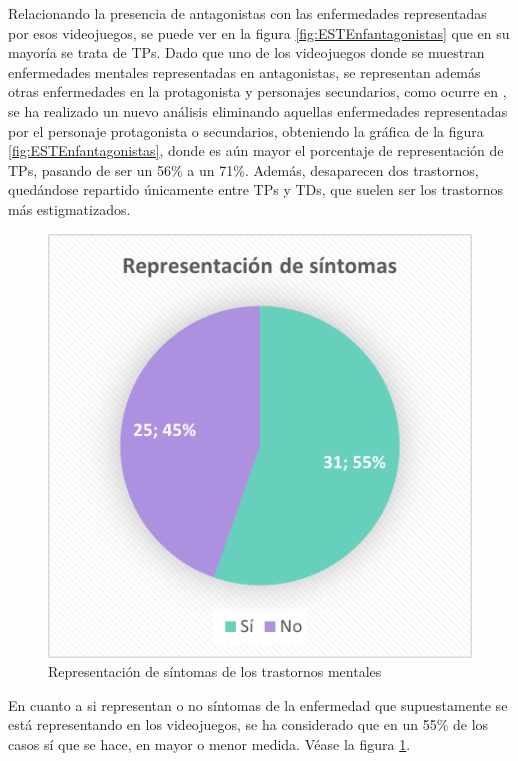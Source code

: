 \documentclass[12pt, a4paper,twoside,titlepage]{book}
\begin{document}
 
Relacionando la presencia de antagonistas con las enfermedades representadas por esos videojuegos, se puede ver en la figura \ref{fig:ESTEnfantagonistas} que en su mayoría se trata de TPs. Dado que uno de los videojuegos donde se muestran enfermedades mentales representadas en antagonistas, se representan además otras enfermedades en la protagonista y personajes secundarios, como ocurre en , se ha realizado un nuevo análisis eliminando aquellas enfermedades representadas por el personaje protagonista o secundarios, obteniendo la gráfica de la figura \ref{fig:ESTEnfantagonistas}, donde es aún mayor el porcentaje de representación de TPs, pasando de ser un 56\% a un 71\%. Además, desaparecen dos trastornos, quedándose repartido únicamente entre TPs y TDs, que suelen ser los trastornos más estigmatizados.  


\begin{figure}
    \centering
    \includegraphics[width=.6\linewidth]{Graficas estudio/G15;Sintomas.png}
    \caption{Representación de síntomas de los trastornos mentales}
    \label{fig:ESTSintomas}
\end{figure}


En cuanto a si representan o no síntomas de la enfermedad que supuestamente se está representando en los videojuegos, se ha considerado que en un 55\% de los casos sí que se hace, en mayor o menor medida. Véase la figura \ref{fig:ESTSintomas}. 
\end{document}
